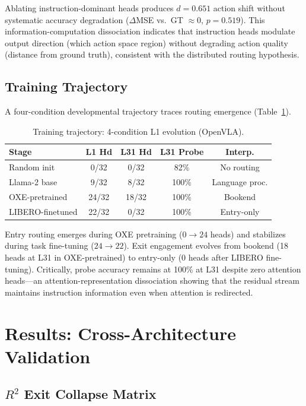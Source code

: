 \documentclass[10pt,twocolumn]{article}
\begin{document}
Ablating instruction-dominant heads produces $d = 0.651$ action shift without systematic accuracy degradation ($\Delta$MSE vs.\ GT $\approx 0$, $p = 0.519$).
This information-computation dissociation indicates that instruction heads modulate output direction (which action space region) without degrading action quality (distance from ground truth), consistent with the distributed routing hypothesis.

\subsection{Training Trajectory}
\label{sec:trajectory}

A four-condition developmental trajectory traces routing emergence (Table~\ref{tab:trajectory}).

\begin{table}[t]
\centering
\caption{Training trajectory: 4-condition L1 evolution (OpenVLA).}
\label{tab:trajectory}
\small
\begin{tabular}{lcccc}
\toprule
Stage & L1 Hd & L31 Hd & L31 Probe & Interp. \\
\midrule
Random init & 0/32 & 0/32 & 82\% & No routing \\
Llama-2 base & 9/32 & 8/32 & 100\% & Language proc. \\
OXE-pretrained & 24/32 & 18/32 & 100\% & Bookend \\
LIBERO-finetuned & 22/32 & 0/32 & 100\% & Entry-only \\
\bottomrule
\end{tabular}
\end{table}

Entry routing emerges during OXE pretraining ($0 \to 24$ heads) and stabilizes during task fine-tuning ($24 \to 22$).
Exit engagement evolves from bookend (18 heads at L31 in OXE-pretrained) to entry-only (0 heads after LIBERO fine-tuning).
Critically, probe accuracy remains at 100\% at L31 despite zero attention heads---an attention-representation dissociation showing that the residual stream maintains instruction information even when attention is redirected.

\section{Results: Cross-Architecture Validation}
\label{sec:cross}

\subsection{$R^2$ Exit Collapse Matrix}
\label{sec:collapse}
\end{document}
